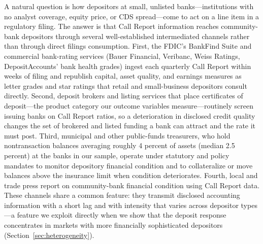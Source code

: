 A natural question is how depositors at small, unlisted banks---institutions
with no analyst coverage, equity price, or CDS spread---come to act on a line
item in a regulatory filing.  The answer is that Call Report information
reaches community-bank depositors through several well-established
intermediated channels rather than through direct filings consumption.  First,
the FDIC's BankFind Suite and commercial bank-rating services (Bauer Financial,
Veribanc, Weiss Ratings, DepositAccounts' bank health grades) ingest each
quarterly Call Report within weeks of filing and republish capital, asset
quality, and earnings measures as letter grades and star ratings that retail
and small-business depositors consult directly.  Second, deposit brokers and
listing services that place certificates of deposit---the product category our
outcome variables measure---routinely screen issuing banks on Call Report
ratios, so a deterioration in disclosed credit quality changes the set of
brokered and listed funding a bank can attract and the rate it must post.
Third, municipal and other public-funds treasurers, who hold nontransaction
balances averaging roughly 4 percent of assets (median 2.5 percent) at the
banks in our sample, operate under statutory and policy mandates to monitor
depository financial condition and to collateralize or move balances above the
insurance limit when condition deteriorates.  Fourth, local and trade press
report on community-bank financial condition using Call Report data.  These
channels share a common feature: they transmit disclosed accounting
information with a short lag and with intensity that varies across depositor
types---a feature we exploit directly when we show that the deposit response
concentrates in markets with more financially sophisticated depositors
(Section~\ref{sec:heterogeneity}).
